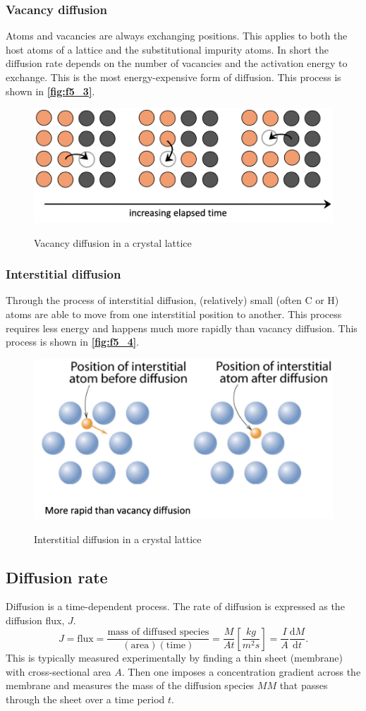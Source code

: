 \subsubsection{Vacancy diffusion}
Atoms and vacancies are always exchanging positions. This applies to both the host atoms of a lattice and the substitutional impurity atoms. In short the diffusion rate depends on the number of vacancies and the activation energy to exchange. This is the most energy-expensive form of diffusion. This process is shown in \textbf{\autoref{fig:f5_3}}.
\begin{figure} [ht]
  \centering
  \caption{Vacancy diffusion in a crystal lattice}
  \includegraphics[width=0.5\linewidth]{./figures/f5_3.png}
  \label{fig:f5_3}
\end{figure}

\subsubsection{Interstitial diffusion}
Through the process of interstitial diffusion, (relatively) small (often C or H) atoms are able to move from one interstitial position to another. This process requires less energy and happens much more rapidly than vacancy diffusion. This process is shown in \textbf{\autoref{fig:f5_4}}.
\begin{figure} [ht]
  \centering
  \caption{Interstitial diffusion in a crystal lattice}
  \includegraphics[width=0.5\linewidth]{./figures/f5_4.png}
  \label{fig:f5_4}
\end{figure}

\subsection{Diffusion rate}
Diffusion is a time-dependent process. The rate of diffusion is expressed as the diffusion flux, $J$.
\[
J = \mathrm{flux} = \frac{\text{mass of diffused species}}{(\mathrm{area})(\mathrm{time})} = \frac{M}{At} \left[ \unit{\frac{kg}{m^2 s}} \right] = \frac{I}{A} \frac{\mathrm{d}M}{\mathrm{d}t}
.\]
This is typically measured experimentally by finding a thin sheet (membrane) with cross-sectional area $A$. Then one imposes a concentration gradient across the membrane and measures the mass of the diffusion species $MM$ that passes through the sheet over a time period $t$. 

